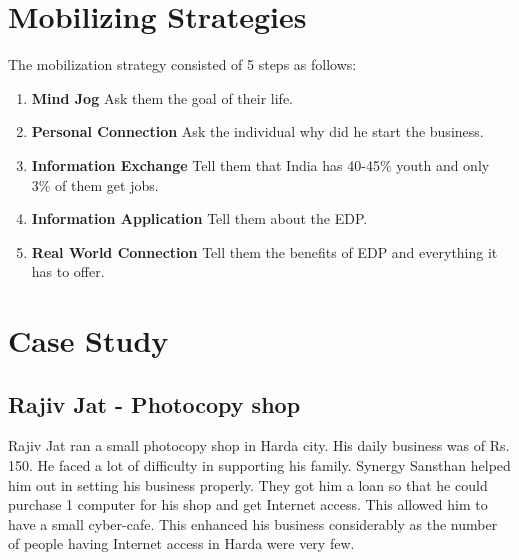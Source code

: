 

\section{Mobilizing Strategies}
The mobilization strategy consisted of 5 steps as follows:
\begin{enumerate}
	\item \textbf{Mind Jog} \newline
		Ask them the goal of their life.
	\item \textbf{Personal Connection} \newline
		Ask the individual why did he start the business.
	\item \textbf{Information Exchange} \newline
		Tell them that India has 40-45\% youth and only 3\% of them get jobs. 
	\item \textbf{Information Application} \newline
		Tell them about the EDP.
	\item \textbf{Real World Connection} \newline
		Tell them the benefits of EDP and everything it has to offer.
\end{enumerate}

\section{Case Study}

\subsection{Rajiv Jat - Photocopy shop}
Rajiv Jat ran a small photocopy shop in Harda city. His daily business was of Rs. 150. He faced a lot of difficulty in supporting his family. Synergy Sansthan helped him out in setting his business properly. They got him a loan so that he could purchase 1 computer for his shop and get Internet access. This allowed him to have a small cyber-cafe. This enhanced his business considerably as the number of people having Internet access in Harda were very few.



